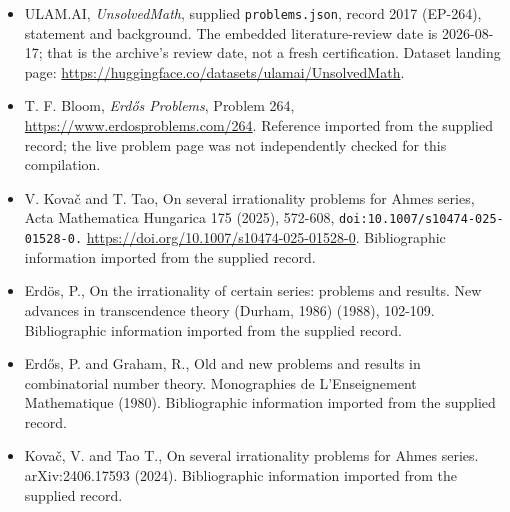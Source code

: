 \documentclass[11pt,a4paper]{article}
\begin{document}
{\small

\begin{itemize}

\item[\hypertarget{source:2017:1}{S1}] ULAM.AI, \emph{UnsolvedMath}, supplied \texttt{problems.json}, record 2017 (EP-264), statement and background. The embedded literature-review date is 2026-08-17; that is the archive’s review date, not a fresh certification. Dataset landing page: \url{https://huggingface.co/datasets/ulamai/UnsolvedMath}.

\item[\hypertarget{source:2017:2}{S2}] T. F. Bloom, \emph{Erdős Problems}, Problem 264, \url{https://www.erdosproblems.com/264}. Reference imported from the supplied record; the live problem page was not independently checked for this compilation.

\item[\hypertarget{source:2017:3}{S3}] V. Kovač and T. Tao, On several irrationality problems for Ahmes series, Acta Mathematica Hungarica 175 (2025), 572-608, \nolinkurl{doi:10.1007/s10474-025-01528-0.} \url{https://doi.org/10.1007/s10474-025-01528-0}. Bibliographic information imported from the supplied record.

\item[\hypertarget{source:2017:4}{S4}] Erd\"{o}s, P., On the irrationality of certain series: problems and results. New advances in transcendence theory (Durham, 1986) (1988), 102-109. Bibliographic information imported from the supplied record.

\item[\hypertarget{source:2017:5}{S5}] Erd\H{o}s, P. and Graham, R., Old and new problems and results in combinatorial number theory. Monographies de L'Enseignement Mathematique (1980). Bibliographic information imported from the supplied record.

\item[\hypertarget{source:2017:6}{S6}] Kovač, V. and Tao T., On several irrationality problems for Ahmes series. arXiv:2406.17593 (2024). Bibliographic information imported from the supplied record.

\end{itemize}

}

\label{end:2017}
\end{document}

